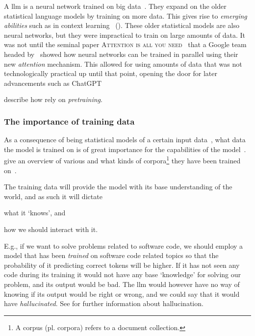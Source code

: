 A \acrlong{llm} is a neural network trained on big data~\cite[3]{llmSurvey}. They expand on the
older statistical language models by training on more data. This gives rise to \textit{emerging
    abilities} such as in context learning~\cite[3]{llmSurvey} (). These
older statistical models are also neural networks, but they were impractical to train on large
amounts of data. It was not until the seminal paper \textsc{Attention is all you
    need}~\cite{attentionIsAllYouNeed} that a Google team headed by~\citeauthor{attentionIsAllYouNeed}
showed how neural networks can be trained in parallel using their new \textit{attention} mechanism.
This allowed for using amounts of data that was not technologically practical up until that point,
opening the door for later advancements such as
ChatGPT~\cite[9]{llmSurvey}

\citeauthor{jm} describe how  rely on \textit{pretraining}.

\subsubsection{The importance of training data}

As a consequence of  being statistical models of a certain input
data~\cite[1]{llmSurvey}, what data the model is trained on is of great
importance for the capabilities of the model~\cite[6]{llmSurvey}.
\citeauthor{llmSurvey} give an overview of various  and what
kinds of corpora\footnote{A corpus (pl. corpora) refers to a document
    collection.} they have been trained on~\cite[11-14]{llmSurvey}.

The training data will provide the model with its base understanding of the
world, and as such it will dictate \begin{inparaenum}
    \item what it `knows', and
    \item how we should interact with it.
\end{inparaenum}
E.g., if we want to solve problems related to software code, we should employ a
model that has been \textit{trained} on software code related topics so that the
probability of it predicting correct tokens will be higher. If it has not seen
any code during its training it would not have any base `knowledge' for solving
our problem, and its output would be bad. The \acrshort{llm} would however have
no way of knowing if its output would be right or wrong, and we could say that
it would have \textit{hallucinated}.
See  for further information
about hallucination.


